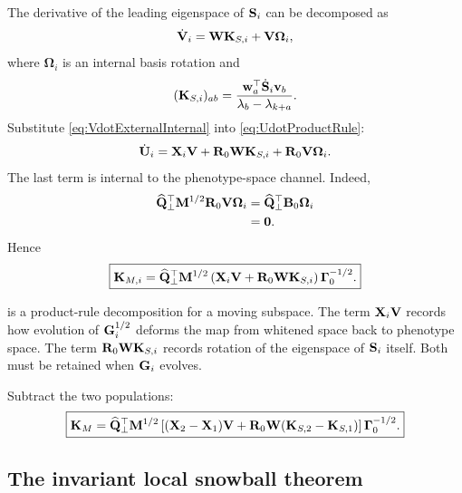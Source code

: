 The derivative of the leading eigenspace of \(\mathbf{S}_i\) can be decomposed as
\begin{equation}
\dot{\mathbf{V}}_i
=\mathbf{W}\mathbf K_{S,i}+\mathbf{V}\boldsymbol\Omega_i,
\label{eq:VdotExternalInternal}
\end{equation}
where \(\boldsymbol\Omega_i\) is an internal basis rotation and
\begin{equation}
(\mathbf K_{S,i})_{ab}
=\frac{\mathbf w_a^\top\dot{\mathbf{S}}_i\mathbf v_b}
{\lambda_b-\lambda_{k+a}}.
\label{eq:KSiDefinition}
\end{equation}
Substitute \cref{eq:VdotExternalInternal} into \cref{eq:UdotProductRule}:
\begin{equation}
\dot{\mathbf U}_i
=\mathbf X_i\mathbf{V}
+\mathbf R_0\mathbf{W}\mathbf K_{S,i}
+\mathbf R_0\mathbf{V}\boldsymbol\Omega_i.
\end{equation}
The last term is internal to the phenotype-space channel. Indeed,
\begin{align}
\widehat{\mathbf{Q}}_{\perp}^{\top}\mathbf{M}^{1/2}
\mathbf R_0\mathbf{V}\boldsymbol\Omega_i
&=\widehat{\mathbf{Q}}_{\perp}^{\top}\mathbf B_0\boldsymbol\Omega_i\\
&=\mathbf{0}.
\end{align}
Hence
\begin{equation}
\boxed{
\mathbf K_{M,i}
=\widehat{\mathbf{Q}}_{\perp}^{\top}\mathbf{M}^{1/2}
\left(\mathbf X_i\mathbf{V}+\mathbf R_0\mathbf{W}\mathbf K_{S,i}\right)
\boldsymbol\Gamma_0^{-1/2}.}
\label{eq:KMiFull}
\end{equation}

\begin{mathteach}
 is a product-rule decomposition for a moving subspace. The term \(\mathbf X_i\mathbf{V}\) records how evolution of \(\mathbf{G}_i^{1/2}\) deforms the map from whitened space back to phenotype space. The term \(\mathbf R_0\mathbf{W}\mathbf K_{S,i}\) records rotation of the eigenspace of \(\mathbf{S}_i\) itself. Both must be retained when \(\mathbf{G}_i\) evolves.
\end{mathteach}

Subtract the two populations:
\begin{equation}
\boxed{
\mathbf K_M
=\widehat{\mathbf{Q}}_{\perp}^{\top}\mathbf{M}^{1/2}
\left[
(\mathbf X_2-\mathbf X_1)\mathbf{V}
+\mathbf R_0\mathbf{W}(\mathbf K_{S,2}-\mathbf K_{S,1})
\right]
\boldsymbol\Gamma_0^{-1/2}.}
\label{eq:relativeCommonMetricK}
\end{equation}

\subsection{The invariant local snowball theorem}

